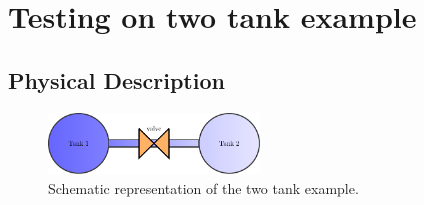 
\section{Testing on two tank example}
\label{sec:twoTanks}
\subsection{Physical Description}
%
\begin{figure}
  \centering
  \includegraphics[width=0.5\textwidth,keepaspectratio=true]{./Content/Figures/twoTanks.pdf}
  \caption{Schematic representation of the two tank example.}
  \label{fig:twoTanks}
\end{figure}

